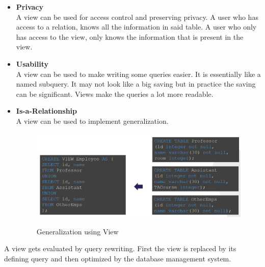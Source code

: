 \begin{itemize}
\item \textbf{Privacy}\\
A view can be used for access control and preserving privacy. A user who has access to a relation, knows all the information in said table. A user who only has access to the view, only knows the information that is present in the view.
\item \textbf{Usability}\\
A view can be used to make writing some queries easier. It is essentially like a named subquery. It may not look like a big saving but in practice the saving can be significant. Views make the queries a lot more readable.
\item \textbf{Is-a-Relationship}\\
A view can be used to implement generalization. 
\begin{figure}[H]
\centering
\includegraphics[width=.8\textwidth]{images/view_generalization.PNG}
\label{view_generalization}
\caption{Generalization using View}
\end{figure}
\end{itemize}
A view gets evaluated by query rewriting. First the view is replaced by its defining query and then optimized by the database management system.\vspace{.3cm}\\

